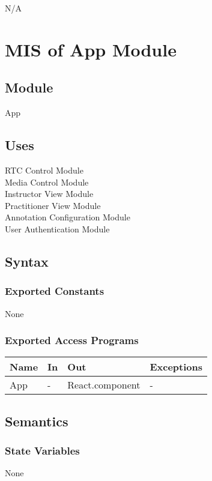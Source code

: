 \documentclass[12pt, titlepage]{article}
\begin{document}
N/A


\section{MIS of App Module}
\label{sec:appmodule}

\subsection{Module}
App

\subsection{Uses}
RTC Control Module\\
Media Control Module\\
Instructor View Module\\
Practitioner View Module\\
Annotation Configuration Module\\
User Authentication Module

\subsection{Syntax}

\subsubsection{Exported Constants}
None

\subsubsection{Exported Access Programs}
\begin{table}[h!]
  \centering
  \begin{tabular}{llll}
    \toprule
    \textbf{Name} & \textbf{In} & \textbf{Out}            & \textbf{Exceptions} \\
    \midrule
    App           & -           & React.component         & -                   \\
    \bottomrule
  \end{tabular}
\end{table}

\subsection{Semantics}

\subsubsection{State Variables}
None
\end{document}
